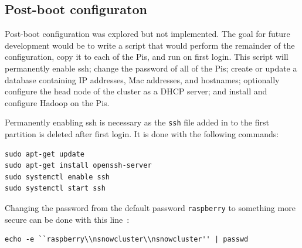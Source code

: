 \subsection{Post-boot configuraton}
Post-boot configuration was explored but not implemented. The goal for
future development would be to write a script that would perform the
remainder of the configuration, copy it to each of the Pis, and run on
first login. This script will permanently enable ssh; change the
password of all of the Pis; create or update a database containing IP
addresses, Mac addresses, and hostnames; optionally configure the head
node of the cluster as a DHCP server; and install and configure Hadoop
on the Pis.

Permanently enabling ssh is necessary as the \verb|ssh| file added in
to the first partition is deleted after first login. It is done with
the following commands:
\begin{verbatim} 
sudo apt-get update
sudo apt-get install openssh-server
sudo systemctl enable ssh
sudo systemctl start ssh
\end{verbatim}

Changing the password from the default password \verb|raspberry| to
something more secure can be done with this
line~\cite{hid-sp18-419-so-password}:
\begin{verbatim} 
echo -e ``raspberry\\nsnowcluster\\nsnowcluster'' | passwd
\end{verbatim}


